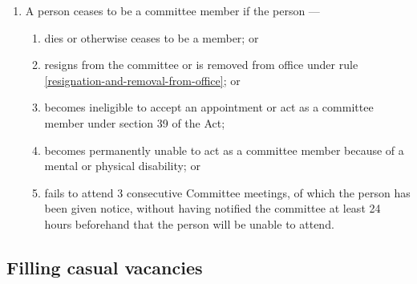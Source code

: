 \documentclass[../constitution.tex]{subfiles}
\begin{document}
\begin{enumerate}

  \item A person ceases to be a committee member if the person ---

        \begin{enumerate}

          \item dies or otherwise ceases to be a member; or
          \item resigns from the committee or is removed from office under rule \ref{resignation-and-removal-from-office}; or
          \item becomes ineligible to accept an appointment or act as a committee member under section 39 of the Act;
          \item becomes permanently unable to act as a committee member because of a mental or physical disability; or
          \item fails to attend 3 consecutive Committee meetings, of which the person has been given notice, without having notified the committee at least 24 hours beforehand that the person will be unable to attend.
        \end{enumerate}
\end{enumerate}


\hypertarget{filling-casual-vacancies}{%
  \subsection{Filling casual vacancies}\label{filling-casual-vacancies}}
\end{document}
